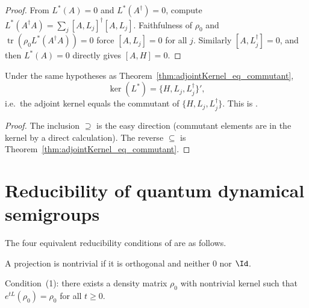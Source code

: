 \begin{proof}
    \leanok
    From $L^*(A) = 0$ and $L^*(A^\dagger) = 0$, compute
    $L^*(A^\dagger A) = \sum_j [A, L_j]^\dagger [A, L_j]$.
    Faithfulness of $\rho_0$ and $\operatorname{tr}(\rho_0 L^*(A^\dagger A)) = 0$
    force $[A, L_j] = 0$ for all $j$.
    Similarly $[A, L_j^\dagger] = 0$, and then $L^*(A) = 0$ directly gives
    $[A, H] = 0$.
\end{proof}

\begin{theorem}
    \label{thm:adjointKernel_eq_commutant_full}
    \leanok
    Under the same hypotheses as
    Theorem~\ref{thm:adjointKernel_eq_commutant},
    \[
        \ker(L^*) = \{H, L_j, L_j^\dagger\}',
    \]
    i.e.\ the adjoint kernel equals the commutant of $\{H, L_j, L_j^\dagger\}$.
    This is \cite[Theorem~7.2]{Wolf2012Quantum}.
\end{theorem}

\begin{proof}
    \leanok
    The inclusion $\supseteq$ is the easy direction
    (commutant elements are in the kernel by a direct calculation).
    The reverse $\subseteq$ is
    Theorem~\ref{thm:adjointKernel_eq_commutant}.
\end{proof}

\section{Reducibility of quantum dynamical semigroups}
\label{sec:qds_reducibility}


The four equivalent reducibility conditions of
\cite[Proposition~7.6]{Wolf2012Quantum} are as follows.

\begin{definition}
    \label{def:is_nontrivial_projection_ch12}
    \leanok
    A projection is nontrivial if it is orthogonal and neither $0$ nor $\Id$.
\end{definition}

\begin{definition}\label{def:has_rank_deficient_fixed_density}
    \leanok
    Condition~(1): there exists a density matrix $\rho_0$ with nontrivial
    kernel such that $e^{tL}(\rho_0) = \rho_0$ for all $t \ge 0$.
\end{definition}

